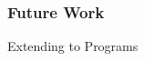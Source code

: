   \begin{frame}
    \frametitle{Future Work}
    \centering
    {\HUGE Extending to Programs}
  \end{frame}
